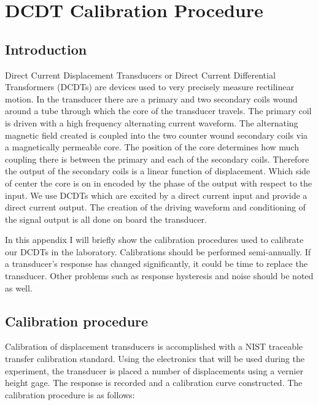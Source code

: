 \chapter{DCDT Calibration Procedure}

\section{Introduction}

Direct Current Displacement Transducers or Direct Current Differential Transformers (DCDTs) are devices
used to very precisely measure rectilinear motion. In the transducer there are a primary and two secondary
coils wound around a tube through which the core of the transducer travels. The primary coil is driven
with a high frequency alternating current waveform. The alternating magnetic field created is coupled into
the two counter wound secondary coils via a magnetically permeable core. The position of the core determines
how much coupling there is between the primary and each of the secondary coils. Therefore the output of the
secondary coils is a linear function of displacement. Which side of center the core is on in encoded by the
phase of the output with respect to the input. We use DCDTs which are excited by a direct current input and
provide a direct current output. The creation of the driving waveform and conditioning of the signal output
is all done on board the transducer.

In this appendix I will briefly show the calibration procedures used to calibrate our DCDTs in the laboratory.
Calibrations should be performed semi-annually. If a transducer's response has changed significantly, it
could be time to replace the transducer. Other problems such as response hysteresis and noise should
be noted as well.

\section{Calibration procedure}
Calibration of displacement transducers is accomplished with a NIST traceable transfer
calibration standard. Using the electronics that will be used during the experiment, the
transducer is placed a number of displacements using a vernier height gage. The response
is recorded and a calibration curve constructed. The calibration procedure is as follows:

